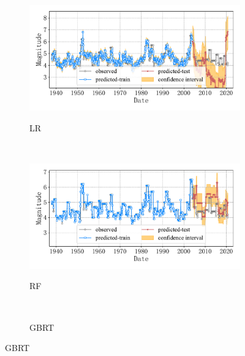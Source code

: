 \begin{figure}[!htbp]
\begin{subfigure}[b]{0.45\textwidth}
    \caption{LR}
    \vspace{-0.2cm}
    \includegraphics[width=\textwidth]{Img/chap5_seism/block2/seism_lr_minyear_1932_maxyear_2021_spanlat_2_spanlon_4_timewindow_72_nextmonth_12_minmag_3.0_block_2.pdf}
    \vspace{-1cm}
    \label{fig:seism_lr_minyear_1932_maxyear_2021_spanlat_2_spanlon_4_timewindow_72_nextmonth_12_minmag_3.0_block_2}
  \end{subfigure}
  ~
  \begin{subfigure}[b]{0.45\textwidth}
    \caption{RF}
    \vspace{-0.2cm}
    \includegraphics[width=\textwidth]{Img/chap5_seism/block2/seism_rf_minyear_1932_maxyear_2021_spanlat_2_spanlon_4_timewindow_72_nextmonth_12_minmag_3.0_block_2.pdf}
    \vspace{-1cm}
    \label{fig:seism_rf_minyear_1932_maxyear_2021_spanlat_2_spanlon_4_timewindow_72_nextmonth_12_minmag_3.0_block_2}
  \end{subfigure}
  \\
  \begin{subfigure}[b]{0.45\textwidth}
    \caption{GBRT}
    \vspace{-0.2cm}

\end{subfigure}
\end{figure}
